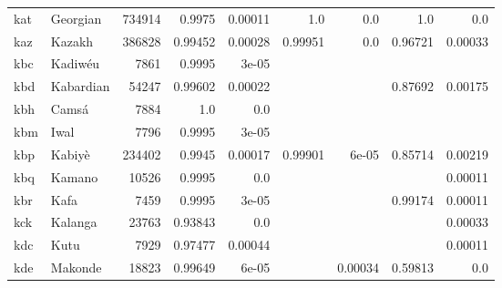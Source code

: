 \documentclass[11pt]{article}
\begin{document}
\begin{table*}[h]
{\begin{tabular}{llrrrrrrr}
kat         & Georgian         & 734914         & 0.9975         & 0.00011         & 1.0         & 0.0         & 1.0         & 0.0         \\

kaz         & Kazakh         & 386828         & 0.99452         & 0.00028         & 0.99951         & 0.0         & 0.96721         & 0.00033         \\

kbc         & Kadiwéu         & 7861         & 0.9995         & 3e-05         &          &          &          &          \\

kbd         & Kabardian         & 54247         & 0.99602         & 0.00022         &          &          & 0.87692         & 0.00175         \\

kbh         & Camsá         & 7884         & 1.0         & 0.0         &          &          &          &          \\

kbm         & Iwal         & 7796         & 0.9995         & 3e-05         &          &          &          &          \\

kbp         & Kabiyè         & 234402         & 0.9945         & 0.00017         & 0.99901         & 6e-05         & 0.85714         & 0.00219         \\

kbq         & Kamano         & 10526         & 0.9995         & 0.0         &          &          &          & 0.00011         \\

kbr         & Kafa         & 7459         & 0.9995         & 3e-05         &          &          & 0.99174         & 0.00011         \\

kck         & Kalanga         & 23763         & 0.93843         & 0.0         &          &          &          & 0.00033         \\

kdc         & Kutu         & 7929         & 0.97477         & 0.00044         &          &          &          & 0.00011         \\

kde         & Makonde         & 18823         & 0.99649         & 6e-05         &          & 0.00034         & 0.59813         & 0.0         \\


\end{tabular}}
\end{table*}
\end{document}
